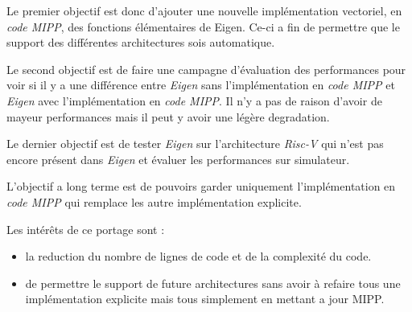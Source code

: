 Le premier objectif est donc d'ajouter une nouvelle implémentation vectoriel, en
\emph{code MIPP}, des fonctions élémentaires de Eigen. Ce-ci a fin de permettre que le
support des différentes architectures sois automatique.

Le second objectif est de faire une campagne d'évaluation des performances pour voir si
il y a une différence entre \emph{Eigen} sans l'implémentation en \emph{code MIPP} et
\emph{Eigen} avec l'implémentation en \emph{code MIPP}. Il n'y a pas de raison d'avoir
de mayeur performances mais il peut y avoir une légère degradation.

Le dernier objectif est de tester \emph{Eigen} sur l'architecture \emph{Risc-V} qui n'est
pas encore présent dans \emph{Eigen} et évaluer les performances sur simulateur.

L'objectif a long terme est de pouvoirs garder uniquement l'implémentation en
\emph{code MIPP} qui remplace les autre implémentation explicite.

Les intérêts de ce portage sont :
\begin{itemize}
  \item la reduction du nombre de lignes de code et de la complexité du code.
  \item de permettre le support de future architectures sans avoir à refaire tous une
  implémentation explicite mais tous simplement en mettant a jour MIPP.
\end{itemize}
